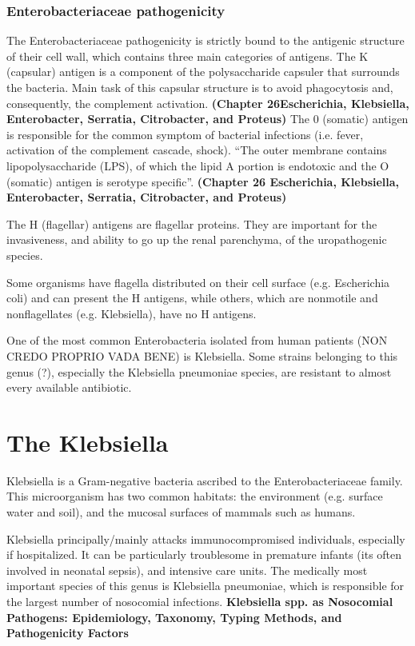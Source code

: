 \documentclass[11pt]{report}
\begin{document}
\subsubsection{Enterobacteriaceae pathogenicity}

The Enterobacteriaceae pathogenicity is strictly bound to the antigenic structure of their cell wall, which contains three main categories of antigens.
The K (capsular) antigen is a component of the polysaccharide capsuler that surrounds the bacteria. Main task of this capsular structure is to avoid phagocytosis and, consequently, the complement activation. 
\textbf{(Chapter 26Escherichia, Klebsiella, Enterobacter, Serratia, Citrobacter, and Proteus)}
The 0 (somatic) antigen is responsible for the common symptom of bacterial infections (i.e. fever, activation of the complement cascade, shock).
“The outer membrane contains lipopolysaccharide (LPS), of which the lipid A portion is endotoxic and the O (somatic) antigen is serotype specific”.  
\textbf{(Chapter 26 Escherichia, Klebsiella, Enterobacter, Serratia, Citrobacter, and Proteus)}

The H (flagellar) antigens are flagellar proteins. They are important for the invasiveness, and ability to go up the renal parenchyma, of the uropathogenic species.

Some organisms have flagella distributed on their cell surface (e.g. Escherichia coli) and can present the H antigens, while others, which are nonmotile and nonflagellates (e.g. Klebsiella), have no H antigens. 

One of the most common Enterobacteria isolated from human patients (NON CREDO PROPRIO VADA BENE) is Klebsiella. Some strains belonging to this genus (?), especially the Klebsiella pneumoniae species, are resistant to almost every available antibiotic.

\section{The Klebsiella}
Klebsiella is a Gram-negative bacteria ascribed to the Enterobacteriaceae family. 
This microorganism has two common habitats: the environment (e.g. surface water and soil), and the mucosal surfaces of mammals such as humans.

Klebsiella principally/mainly attacks immunocompromised individuals, especially if hospitalized. It can be particularly troublesome in premature infants (its often involved in neonatal sepsis), and intensive care units. 
The medically most important species of this genus is Klebsiella pneumoniae, which is responsible for the largest number of nosocomial infections. 
\textbf{Klebsiella spp. as Nosocomial Pathogens: Epidemiology, Taxonomy,
Typing Methods, and Pathogenicity Factors}
\end{document}
